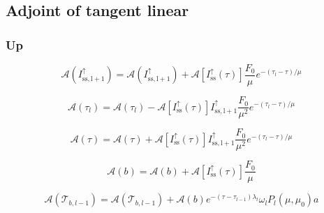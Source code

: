 %
\subsection{Adjoint of tangent linear}
\label{sec:single_scattering-adjoint_of_tangent_linear}

\subsubsection{Up}
\label{sec:single_scattering-adjoint_of_tangent_linear-up}

\begin{equation}
\mathcal{A}(I^{\uparrow}_{\mathrm{ss,l+1}}) = \mathcal{A}(I^{\uparrow}_{\mathrm{ss,l+1}}) + \mathcal{A}\left[I^{\uparrow}_{\mathrm{ss}}(\tau)\right]\frac{F_{0}}{\mu} e^{-(\tau_{l} - \tau) / \mu}
\label{eq:single_scattering-adjoint_of_tangent_linear-up-I_up_ss_l_p_1}
\end{equation}

\begin{equation}
\mathcal{A}(\tau_{l}) = \mathcal{A}(\tau_{l}) - \mathcal{A}\left[I^{\uparrow}_{\mathrm{ss}}(\tau)\right] I^{\uparrow}_{\mathrm{ss,l+1}} \frac{F_{0}}{\mu^{2}} e^{-(\tau_{l} - \tau) / \mu}
\label{eq:single_scattering-adjoint_of_tangent_linear-up-tau_l_a}
\end{equation}

\begin{equation}
\mathcal{A}(\tau) = \mathcal{A}(\tau) + \mathcal{A}\left[I^{\uparrow}_{\mathrm{ss}}(\tau)\right] I^{\uparrow}_{\mathrm{ss,l+1}} \frac{F_{0}}{\mu^{2}} e^{-(\tau_{l} - \tau) / \mu}
\label{eq:single_scattering-adjoint_of_tangent_linear-up-tau_a}
\end{equation}

\begin{equation}
\mathcal{A}(b) = \mathcal{A}(b) + \mathcal{A}\left[I^{\uparrow}_{\mathrm{ss}}(\tau)\right]\frac{F_{0}}{\mu}
\label{eq:single_scattering-adjoint_of_tangent_linear-up-b_a}
\end{equation}

\begin{equation}
\mathcal{A}(\mathcal{T}_{b,l-1}) = \mathcal{A}(\mathcal{T}_{b,l-1}) + \mathcal{A}(b) e^{-(\tau - \tau_{l-1})\lambda_{l}} \omega_{l} P_{l}(\mu, \mu_0) a
\label{eq:single_scattering-adjoint_of_tangent_linear-up-t_s_a}
\end{equation}

